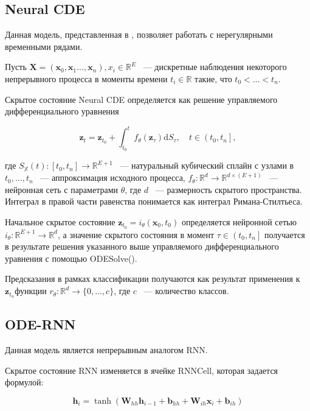 \documentclass{article}
\newcommand{\R}{\mathbb{R}}
\begin{document}
\subsection{Neural CDE}

Данная модель, представленная в \cite{cde}, позволяет работать с нерегулярными временными рядами.

Пусть $\mathbf{X} = (\mathbf{x}_0, \mathbf{x}_1 ..., \mathbf{x}_n), x_i \in \mathbb{R}^E$ ~--- дискретные наблюдения некоторого непрерывного процесса в моменты времени $t_i\in \mathbb{R}$ такие, что $t_0 < \dots < t_n$. 

Скрытое состояние Neural CDE определяется как решение управляемого дифференциального уравнения 

$$
\mathbf{z}_{t}=\mathbf{z}_{t_{0}}+\int_{t_{0}}^{t} f_{\theta}\left(\mathbf{z}_{\tau}\right) \mathrm{d} S_{\tau}, \quad t \in\left(t_{0}, t_{n}\right],
$$

где $S_\mathbb{X}(t) : \left[t_0, t_n \right] \rightarrow \mathbb{R}^{E+1}$ ~--- натуральный кубический сплайн с узлами в $t_0, \dots, t_n$ ~--- аппроксимация исходного процесса, $f_{\theta}: \mathbb{R}^{d} \rightarrow \mathbb{R}^{d\times(E+1)}$ ~--- нейронная сеть с параметрами $\theta$, где $d$ ~--- размерность скрытого пространства. Интеграл в правой части равенства понимается как интеграл Римана-Стилтьеса.

Начальное скрытое состояние $\mathbf{z}_{t_0} = i_{\theta}(\mathbf{x}_0, t_0)$ определяется нейронной сетью $i_{\theta}: \R^{E+1} \rightarrow \R^{d}$, а значение скрытого состояния в момент $\tau \in\left(t_0, t_n\right]$ получается в результате решения указанного выше управляемого дифференциального уравнения с помощью ODESolve().

Предсказания в рамках классификации получаются как результат применения к $\mathbf{z}_{t_n} $функции $r_{\theta} : \R^{d} \rightarrow \{0, \dots, c\}$, где $c$ ~--- количество классов. 

\subsection{ODE-RNN}

Данная модель\cite{NEURIPS2019_42a6845a} является непрерывным аналогом RNN. 

Скрытое состояние RNN изменяется в ячейке RNNCell, которая задается формулой:

$$
\mathbf{h}_i = \tanh(\mathbf{W}_{hh} \mathbf{h}_{i-1} + \mathbf{b}_{hh} + \mathbf{W}_{ih}\mathbf{x}_i + \mathbf{b}_{ih})
$$
\end{document}
